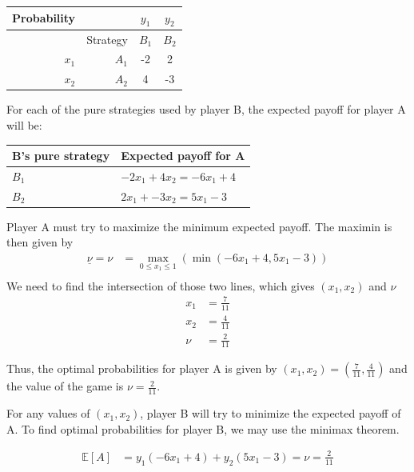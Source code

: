 \documentclass[12pt]{article}
\begin{document}
\begin{center}
  \begin{tabular}{|r|r|cc|}
    \hline
    Probability &          & $y_1$ & $y_2$ \\
    \hline
                & Strategy & $B_1$ & $B_2$ \\
    \hline
    $x_1$       & $A_1$    & -2    & 2     \\
    $x_2$       & $A_2$    & 4     & -3    \\
    \hline
  \end{tabular}
\end{center}

For each of the pure strategies used by player B, the expected payoff for player A will be:

\begin{center}
  \begin{tabular}{|l|l|}
    \hline
    \textbf{B's pure strategy} & \textbf{Expected payoff for A}              \\ 
    \hline
    $B_1$            & $-2 x_1 +4 x_2 = -6 x_1 + 4$ \\
    $B_2$            & $2 x_1 + -3 x_2 = 5 x_1 - 3$ \\
    \hline                    
  \end{tabular}
\end{center}
Player A must try to maximize the minimum expected payoff. The maximin is then given by
\begin{align*}
  \underline{\nu} = \nu &= \max_{0\le x_1\le 1}\left(\min\left(-6 x_1 + 4, 5 x_1-3\right)\right) \\
\end{align*}
We need to find the intersection of those two lines, which gives $\left(x_1,x_2\right)$ and $\nu$
\begin{align*}
  x_1 &= \frac{7}{11} \\
  x_2 &= \frac{4}{11} \\
  \nu &= \frac{2}{11}
\end{align*}

Thus, the optimal probabilities for player A is given by $\left(x_1,x_2\right) = \left(\frac{7}{11}, \frac{4}{11}\right)$
and the value of the game is $\nu = \frac{2}{11}$.

For any values of $\left(x_1,x_2\right)$, player B will try to minimize the expected payoff of A. 
To find optimal probabilities for player B, we may use the minimax theorem. 

\begin{align*}
  \mathbb{E}[A] &= y_1 \left(-6 x_1+4\right) + y_2 \left(5 x_1 - 3\right) = \nu = \frac{2}{11}
\end{align*}
\end{document}

